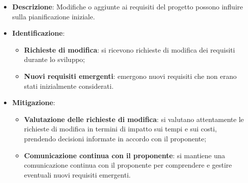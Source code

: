 \label{risk:cambiamenti nei requisiti}
\begin{itemize}
	\item \textbf{Descrizione}:
			Modifiche o aggiunte ai requisiti del progetto possono influire 
			sulla pianificazione iniziale.
	\item \textbf{Identificazione}:
	      \begin{itemize}
		      \item \textbf{Richieste di modifica}: si ricevono richieste di modifica 
			  		dei requisiti durante lo sviluppo;

			  \item \textbf{Nuovi requisiti emergenti}: emergono nuovi requisiti che 
			  		non erano stati inizialmente considerati.
			  
	      \end{itemize}
	\item \textbf{Mitigazione}:
	      \begin{itemize}
		      \item \textbf{Valutazione delle richieste di modifica}: si valutano 
			  		attentamente le richieste di modifica in termini di impatto 
					sui tempi e sui costi, prendendo decisioni informate in 
					accordo con il proponente;

		      \item \textbf{Comunicazione continua con il proponente}: si mantiene 
			  		una comunicazione continua con il proponente per comprendere 
					e gestire eventuali nuovi requisiti emergenti.
	      \end{itemize}
\end{itemize}
